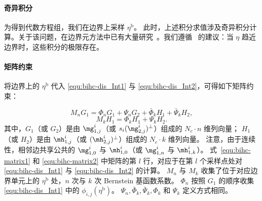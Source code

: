 \paragraph{奇异积分}
为得到代数方程组，我们在边界上采样 \(\eta^{\text{b}}\)。
%
此时，上述积分求值涉及奇异积分计算。关于该问题，在边界元方法中已有大量研究~\cite{Fischer1999ApplicationOH}。我们遵循~\cite{Weber2012} 的建议：当 \(\eta\) 趋近边界时，这些积分的极限存在。

\paragraph{矩阵约束}
将边界上的 \(\eta^{\text{b}}\) 代入 \eqref{equ:bihc-dis_Int1} 与 \eqref{equ:bihc-dis_Int2}，可得如下矩阵约束：

\begin{equation}\label{equ:bihc-matrix1}
    M_nG_1=\Phi_nG_1+\Psi_n G_2+\bar{\Phi}_k H_1+\bar{\Psi}_k H_2,
\end{equation}
\begin{equation}\label{equ:bihc-matrix2}
    M_k H_1=\Phi_k H_1+\Psi_k H_2.
\end{equation}
其中，\(G_1\)（或 \(G_2\)）是由 \(\mg_{1,j}^i\)（或 \(s_i (\mg_{2,j}^{i})^{\perp}\)）组成的 \(N_c\cdot n\) 维列向量；
\(H_1\)（或 \(H_2\)）是由 \(\mh_{1,j}^i\)（或 \((\mh_{2,j}^{i})^{\perp}\)）组成的 \(N_c\cdot k\) 维列向量。
注意，由于连续性，相邻边共享公共的 \(\mg_{1,0}^i\) 与 \(\mh_{1,0}^i\)（或 \(\mg_{1,n}^i\) 与 \(\mh_{1,k}^i\)）。
式~\eqref{equ:bihc-matrix1} 和 \eqref{equ:bihc-matrix2} 中矩阵的第 \(l\) 行，对应于在第 \(l\) 个采样点处对 \eqref{equ:bihc-dis_Int1} 与 \eqref{equ:bihc-dis_Int2} 的计算。
\(M_n\) 与 \(M_k\) 收集了位于对应边界单元上的 \(\eta^{\text{b}}\) 处，$n$ 次与 $k$ 次 Bernstein 基函数系数。
\(\Phi_n\) 按照 \(G_1\) 的顺序收集 \eqref{equ:bihc-dis_Int1} 中的 \(\phi_{i,j}(\eta^{\text{b}})\)。
\(\Psi_n,\bar{\Phi}_k,\bar{\Psi}_k,\Phi_k\) 和 \(\Psi_k\) 定义方式相同。


